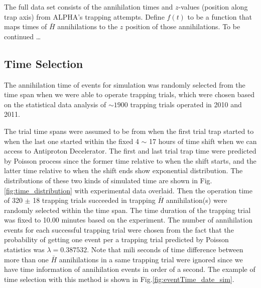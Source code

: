 \documentclass[superscriptaddress,aps,prb,11pt]{revtex4-1}
\begin{document}
The full data set consists of the annihilation times and $z$-values (position along trap axis) from ALPHA's trapping attempts.  Define $f(t)$ to be a function that maps times of $\bar{H}$ annihilations to the $z$ position of those annihilations.  To be continued \ldots

\subsection*{Time Selection}
 The annihilation time of events for simulation was randomly selected from the time span when we were able to operate trapping trials, which were chosen based on the statistical data analysis of $\sim 1900$  trapping trials operated in 2010 and 2011.

 The trial time spans were assumed to be from when the first trial trap started to when the last one started within the fixed  4 $\sim$ 17 hours of time shift when we can access to Antiproton Decelerator. The first and last trial trap time were predicted by Poisson process since the former time relative to when the shift starts, and the latter time relative to when the shift ends show exponential distribution. The distributions of these two kinds of simulated time are shown in Fig.\ref{fig:time_distribution} with experimental data overlaid. Then the operation time of 320 $\pm$ 18 trapping trials succeeded in trapping $\bar{H}$ annihilation(s) were randomly selected within the time span. The time duration of the trapping trial was fixed to 10.00 minutes based on the experiment. The number of annihilation events for each successful trapping trial were chosen from the fact that the probability of getting one event per a trapping trial predicted by Poisson statistics was $\lambda=0.387532$. Note that mili seconds of time difference between more than one $\bar{H}$ annihilations in a same trapping trial were ignored since we have time information of annihilation events in order of a second. The example of time selection with this method is shown in Fig.\ref{fig:eventTime_date_sim}.
\end{document}

